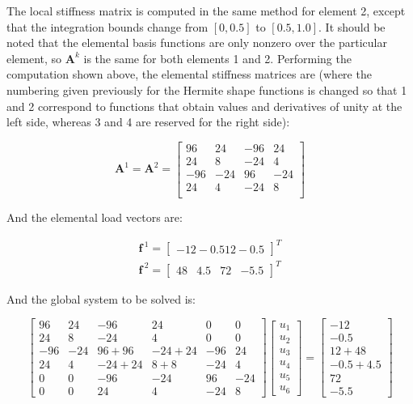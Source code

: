 \documentclass[10pt]{article}
\newcommand{\beq}{\begin{equation}}
\newcommand{\eeq}{\end{equation}}
\newcommand{\beqa}{\begin{equation}\begin{aligned}}
\newcommand{\eeqa}{\end{aligned}\end{equation}}
\begin{document}
The local stiffness matrix is computed in the same method for element 2, except that the integration bounds change from \([0, 0.5]\) to \([0.5, 1.0]\). It should be noted that the elemental basis functions are only nonzero over the particular element, so \(\textbf{A} ^k\) is the same for both elements 1 and 2. Performing the computation shown above, the elemental stiffness matrices are (where the numbering given previously for the Hermite shape functions is changed so that 1 and 2 correspond to functions that obtain values and derivatives of unity at the left side, whereas 3 and 4 are reserved for the right side):

\beq
\textbf{A}^1=\textbf{A}^2=\begin{bmatrix}
96 & 24 & -96 & 24\\
24 & 8 & -24 & 4\\
-96 & -24 & 96 & -24\\
24 & 4 & -24 & 8\\
\end{bmatrix}
\eeq

And the elemental load vectors are:

\beqa
\textbf{f}^{\ 1}=\begin{bmatrix}-12 -0.5 12 -0.5\end{bmatrix}^T\\
\textbf{f}^{\ 2}=\begin{bmatrix}48 &4.5 & 72 & -5.5\end{bmatrix}^T
\eeqa

And the global system to be solved is:

\beq
\begin{bmatrix}
96 & 24 & -96 & 24 & 0 & 0\\
24 & 8 & -24 & 4 & 0 & 0\\
-96 & -24 & 96+96 & -24+24 & -96 & 24\\
24 & 4 & -24+24 & 8+8 &-24 & 4\\
0 & 0 & -96 & -24 & 96 & -24\\
0 & 0 & 24 & 4 & -24 & 8
\end{bmatrix}
\begin{bmatrix}
u_1\\u_2\\u_3\\u_4\\ u_5\\ u_6
\end{bmatrix}
=
\begin{bmatrix}
-12 \\-0.5 \\12+48 \\-0.5+4.5\\ 72\\-5.5
\end{bmatrix}
\eeq
\end{document}
